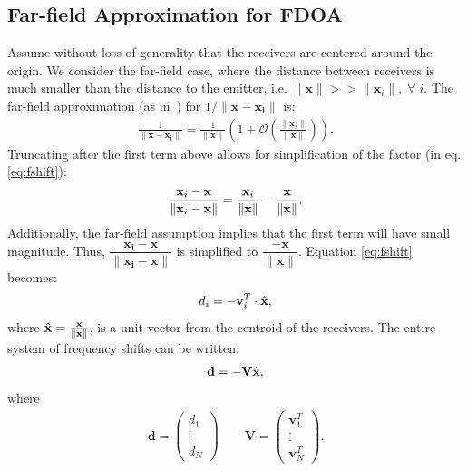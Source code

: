 \subsection{Far-field Approximation for FDOA}
Assume without loss of generality that the receivers are centered around the origin. We consider the far-field case, where the distance between receivers is much smaller than the distance to the emitter, i.e. $\|\mathbf{x}\|>>\|\mathbf{x}_i\|, \; \forall \; i$. The far-field approximation (as in~\cite{Cheney2009}) for $1/\|\mathbf{x-x_i}\|$ is:
\begin{align*}
  \frac{1}{\|\mathbf{x-x_i}\|} = \frac{1}{\|\mathbf{x}\|}\left(1+\mathcal{O}\left(\frac{\|\mathbf{x}_i\|}{\|\mathbf{x}\|}\right)\right).
\end{align*}
Truncating after the first term above allows for simplification of the factor (in eq. \ref{eq:fshift}):
\begin{align*}
  \frac{\mathbf{x}_i-\mathbf{x}}{\|\mathbf{x}_i-\mathbf{x}\|} = \frac{\mathbf{x}_i}{\|\mathbf{x}\|}-\frac{\mathbf{x}}{\|\mathbf{x}\|}.
\end{align*}
Additionally, the far-field assumption implies that the first term will have small magnitude. Thus, $\dfrac{\mathbf{x_i-x}}{\|\mathbf{x_i-x}\|}$ is simplified to $\dfrac{-\mathbf{x}}{\|\mathbf{x}\|}$.
Equation \ref{eq:fshift} becomes:
\begin{align}
  d_i =  -\mathbf{v}_i^T\cdot\hat{\mathbf{x}},
\end{align}
where $\hat{\mathbf{x}} = \frac{\mathbf{x}}{\|\mathbf{x}\|}$, is a unit vector from the centroid of the receivers. The entire system of frequency shifts can be written:
\begin{align}
  \label{eq:fshiftFF}
\mathbf{d} = -\mathbf{V}\hat{\mathbf{x}},
\end{align}
where \begin{align*}
\mathbf{d}=\begin{pmatrix}
d_1 \\ \vdots \\ d_N
\end{pmatrix}
\qquad
\mathbf{V}=\begin{pmatrix}
\mathbf{v}_1^T \\ \vdots\\ \mathbf{v}_N^T
\end{pmatrix}.
\end{align*}

